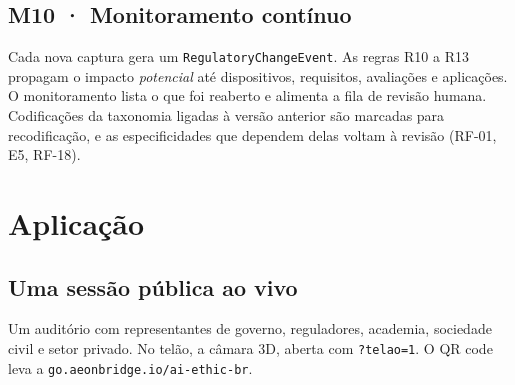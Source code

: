 \documentclass[12pt,a4paper,oneside,english,brazil]{abntex2}
\newcommand{\rf}[1]{{\footnotesize(#1)}}
\begin{document}
\section{M10 · Monitoramento contínuo}\label{sec:monitoramento}
Cada nova captura gera um \texttt{RegulatoryChangeEvent}. As regras R10 a R13 propagam o impacto \emph{potencial} até dispositivos, requisitos, avaliações e aplicações. O monitoramento lista o que foi reaberto e alimenta a fila de revisão humana. Codificações da taxonomia ligadas à versão anterior são marcadas para recodificação, e as especificidades que dependem delas voltam à revisão \rf{RF-01, E5, RF-18}.

\chapter{Aplicação}

\section{Uma sessão pública ao vivo}
Um auditório com representantes de governo, reguladores, academia, sociedade civil e setor privado. No telão, a câmara 3D, aberta com \texttt{?telao=1}. O QR code leva a \texttt{go.aeonbridge.io/ai-ethic-br}.
\end{document}
